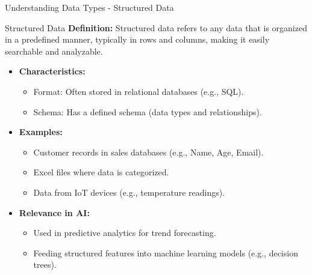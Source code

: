 \documentclass[aspectratio=169]{beamer}
\begin{document}
\begin{frame}[fragile]{Understanding Data Types - Structured Data}
    \begin{block}{Structured Data}
        \textbf{Definition:} 
        Structured data refers to any data that is organized in a predefined manner, typically in rows and columns, making it easily searchable and analyzable.
    \end{block}

    \begin{itemize}
        \item \textbf{Characteristics:}
        \begin{itemize}
            \item Format: Often stored in relational databases (e.g., SQL).
            \item Schema: Has a defined schema (data types and relationships).
        \end{itemize}

        \item \textbf{Examples:}
        \begin{itemize}
            \item Customer records in sales databases (e.g., Name, Age, Email).
            \item Excel files where data is categorized.
            \item Data from IoT devices (e.g., temperature readings).
        \end{itemize}
        
        \item \textbf{Relevance in AI:}
        \begin{itemize}
            \item Used in predictive analytics for trend forecasting.
            \item Feeding structured features into machine learning models (e.g., decision trees).
        \end{itemize}
    \end{itemize}
\end{frame}
\end{document}
